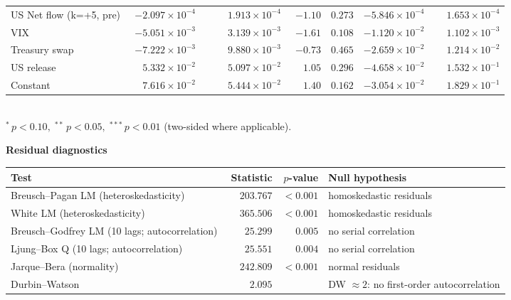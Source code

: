 \documentclass[10pt]{article}
\begin{document}
\begin{tabular}{@{}l|r@{}l rrr rr@{}}
US Net flow (k=+5, pre) & $-2.097\!\times\!10^{-4}$ & \textsuperscript{} & $\phantom{-}1.913\!\times\!10^{-4}$ & $-1.10$ & $0.273$ & $-5.846\!\times\!10^{-4}$ & $\phantom{-}1.653\!\times\!10^{-4}$ \\
\addlinespace[0.3em]
VIX & $-5.051\!\times\!10^{-3}$ & \textsuperscript{} & $\phantom{-}3.139\!\times\!10^{-3}$ & $-1.61$ & $0.108$ & $-1.120\!\times\!10^{-2}$ & $\phantom{-}1.102\!\times\!10^{-3}$ \\
Treasury swap & $-7.222\!\times\!10^{-3}$ & \textsuperscript{} & $\phantom{-}9.880\!\times\!10^{-3}$ & $-0.73$ & $0.465$ & $-2.659\!\times\!10^{-2}$ & $\phantom{-}1.214\!\times\!10^{-2}$ \\
US release & $\phantom{-}5.332\!\times\!10^{-2}$ & \textsuperscript{} & $\phantom{-}5.097\!\times\!10^{-2}$ & $\phantom{-}1.05$ & $0.296$ & $-4.658\!\times\!10^{-2}$ & $\phantom{-}1.532\!\times\!10^{-1}$ \\
\addlinespace[0.3em]
Constant & $\phantom{-}7.616\!\times\!10^{-2}$ & \textsuperscript{} & $\phantom{-}5.444\!\times\!10^{-2}$ & $\phantom{-}1.40$ & $0.162$ & $-3.054\!\times\!10^{-2}$ & $\phantom{-}1.829\!\times\!10^{-1}$ \\
\hline
\end{tabular}
\\[0.2em]
{\footnotesize $^{*}\,p<0.10,\;^{**}\,p<0.05,\;^{***}\,p<0.01$ (two-sided where applicable).}
\vspace{0.9em}

\noindent\textbf{Residual diagnostics}\\[0.3em]
\begin{tabular}{@{}l|rr l@{}}
\hline
Test & Statistic & $p$-value & Null hypothesis \\
\hline
Breusch--Pagan LM (heteroskedasticity) & $\phantom{-}203.767$ & $<\!0.001$ & homoskedastic residuals \\
White LM (heteroskedasticity) & $\phantom{-}365.506$ & $<\!0.001$ & homoskedastic residuals \\
Breusch--Godfrey LM (10 lags; autocorrelation) & $\phantom{-}25.299$ & $0.005$ & no serial correlation \\
Ljung--Box Q (10 lags; autocorrelation) & $\phantom{-}25.551$ & $0.004$ & no serial correlation \\
Jarque--Bera (normality) & $\phantom{-}242.809$ & $<\!0.001$ & normal residuals \\
Durbin--Watson & $\phantom{-}2.095$ &  & DW $\approx 2$: no first-order autocorrelation \\
\hline
\end{tabular}
\end{document}
